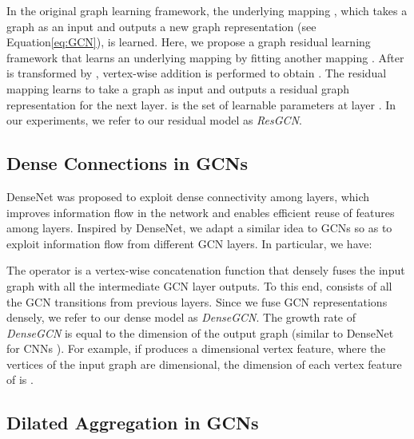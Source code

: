 \documentclass[10pt,twocolumn,letterpaper]{article}
\newcommand{\eqLabel}{Equation\xspace}
\begin{document}
In the original graph learning framework, the underlying mapping , which takes a graph as an input and outputs a new graph representation (see \eqLabel \eqref{eq:GCN}), is learned.
Here, we propose a graph residual learning framework that learns an underlying mapping  by fitting another mapping . After  is transformed by , vertex-wise addition is performed to obtain . The residual mapping  learns to take a graph  as input and outputs a residual graph representation  for the next layer.  is the set of learnable parameters at layer . In our experiments, we refer to our residual model as \emph{ResGCN}.


\subsection{Dense Connections in GCNs} \label{sec:DenseGCN}
DenseNet \cite{huang2017densely} was proposed to exploit dense connectivity among layers, which improves information flow in the network and enables efficient reuse of features among layers. Inspired by DenseNet, we adapt a similar idea to GCNs so as to exploit information flow from different GCN layers. In particular, we have:

The operator  is a vertex-wise concatenation function that densely fuses the input graph  with all the intermediate GCN layer outputs. To this end,  consists of all the GCN transitions from previous layers. Since we fuse GCN representations densely, we refer to our dense model as \emph{DenseGCN}. The growth rate of \emph{DenseGCN} is equal to the dimension  of the output graph (similar to DenseNet for CNNs \cite{huang2017densely}). For example, if  produces a  dimensional vertex feature, where the vertices of the input graph  are  dimensional, the dimension of each vertex feature of  is . 

\subsection{Dilated Aggregation in GCNs} \label{sec:dilation}
\end{document}
